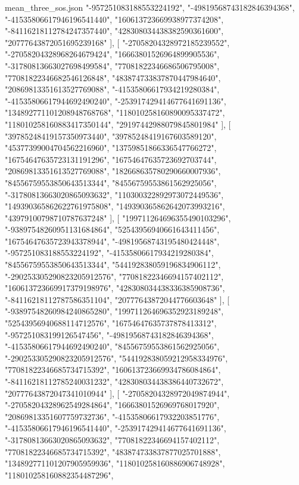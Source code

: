 \begin{filecontents*}[overwrite]{mean_three_sos.json}
    "-957251083188553224192",
    "-49819568743182846394368",
    "-41535806617946196541440",
    "160613723669938977374208",
    "-84116218112784247357440",
    "428308034438382590361600",
    "20777643872051695239168"
   ],
   [
    "-27058204328972185239552",
    "-27058204328968264679424",
    "16663801526964899905536",
    "-31780813663027698499584",
    "77081822346686506795008",
    "77081822346682546126848",
    "483874733837870447984640",
    "20869813351613527769088",
    "-41535806617934219280384",
    "-41535806617944692490240",
    "-253917429414677641691136",
    "134892771101208948768768",
    "118010258160890095337472",
    "118010258160883417350144",
    "29197442988079845801984"
   ],
   [
    "39785248419157350973440",
    "39785248419167603589120",
    "45377399004704562216960",
    "13759851866336547766272",
    "16754647635723131191296",
    "16754647635723692703744",
    "20869813351613527769088",
    "182668635780290660007936",
    "84556759553850643513344",
    "84556759553861562925056",
    "-31780813663020865093632",
    "110300322892973072449536",
    "149390365862622761975808",
    "149390365862642073993216",
    "43979100798710787637248"
   ],
   [
    "199711264696355490103296",
    "-93897548260951131684864",
    "52543956940661643411456",
    "16754647635723943378944",
    "-49819568743195480424448",
    "-957251083188553224192",
    "-41535806617934219280384",
    "84556759553850643513344",
    "544192838059196834906112",
    "-290253305290823205912576",
    "77081822346694157402112",
    "160613723669917379198976",
    "428308034438336385908736",
    "-84116218112787586351104",
    "20777643872044776603648"
   ],
   [
    "-93897548260984240865280",
    "199711264696352923189248",
    "52543956940688114712576",
    "16754647635737878413312",
    "-957251083199126547456",
    "-49819568743182846394368",
    "-41535806617944692490240",
    "84556759553861562925056",
    "-290253305290823205912576",
    "544192838059212958334976",
    "77081822346685734715392",
    "160613723669934786084864",
    "-84116218112785240031232",
    "428308034438386440732672",
    "20777643872047341010944"
   ],
   [
    "-27058204328972049874944",
    "-27058204328962549284864",
    "16663801526969768017920",
    "20869813351607759732736",
    "-41535806617932203851776",
    "-41535806617946196541440",
    "-253917429414677641691136",
    "-31780813663020865093632",
    "77081822346694157402112",
    "77081822346685734715392",
    "483874733837877025701888",
    "134892771101207905959936",
    "118010258160886906748928",
    "118010258160882354487296",

\end{filecontents*}
